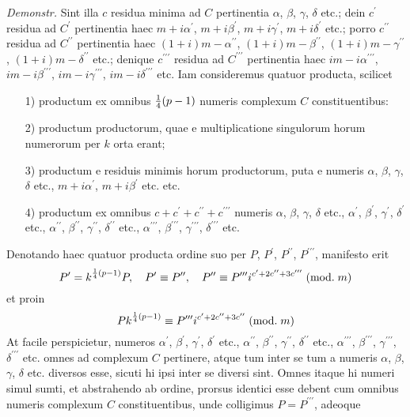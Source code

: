 \documentclass[twoside,12pt]{memoir}
\renewcommand{\pmod}[1]{\;(\textrm{mod.}\;#1)}
\let\oldfrac\frac
\def\frac#1#2{\mathchoice{\tfrac{#1}{#2}}{\oldfrac{#1}{#2}}{\genfrac{}{}{}{2}{#1}{#2\mathstrut}}{\genfrac{}{}{}{3}{#1}{#2\mathstrut}}}
\begin{document}
\textit{Demonstr.} Sint illa \(c\) residua minima ad \(C\) pertinentia \(\alpha\), \( \beta\), \( \gamma\), \( \delta\) etc.; dein \(c^{\prime}\) residua ad \(C^{\prime}\) pertinentia haec \(m+i \alpha^{\prime}\), \( m+i \beta^{\prime}\), \( m+i \gamma^{\prime}\), \( m+i \delta^{\prime}\) etc.; porro \(c^{\prime \prime}\) residua ad \(C^{\prime \prime}\) pertinentia haec \((1+i) m-\alpha^{\prime \prime}\), \((1+i) m-\beta^{\prime \prime}\), \((1+i) m-\gamma^{\prime \prime}\), \((1+i) m-\delta^{\prime \prime}\) etc.; denique \(c^{\prime \prime \prime}\) residua ad \(C^{\prime \prime \prime}\) pertinentia haec \(i m-i \alpha^{\prime \prime \prime}\), \( i m-i \beta^{\prime \prime \prime}\), \(i m-i \gamma^{\prime \prime \prime}\), \( i m-i \delta^{\prime \prime \prime}\) etc. Iam consideremus quatuor producta, scilicet
 \begin{enumerate}
\item[1)] productum ex omnibus \(\frac{1}{4}(p-1)\) numeris complexum \(C\) constituentibus:
\item[2)] productum productorum, quae e multiplicatione singulorum horum numerorum per \(k\) orta erant;
\item[3)] productum e residuis minimis horum productorum, puta e numeris \(\alpha\), \( \beta\), \(\gamma\), \( \delta\) etc., \(m+i \alpha^{\prime}\), \( m+i \beta^{\prime}\) etc. etc.
\item[4)] productum ex omnibus \(c+c^{\prime}+c^{\prime \prime}+c^{\prime \prime \prime}\) numeris \(\alpha\), \( \beta\), \( \gamma\), \( \delta\) etc., \(\alpha^{\prime}\), \( \beta^{\prime}\), \( \gamma^{\prime}\), \(\delta^{\prime}\) etc., \(\alpha^{\prime \prime}\), \( \beta^{\prime \prime}\), \( \gamma^{\prime \prime}\), \( \delta^{\prime \prime}\) etc., \(\alpha^{\prime \prime \prime}\), \( \beta^{\prime \prime \prime}\), \( \gamma^{\prime \prime \prime}\), \( \delta^{\prime \prime \prime}\) etc.
\end{enumerate}
Denotando haec quatuor producta ordine suo per \(P\), \( P^{\prime} \), \( P^{\prime \prime}\), \( P^{\prime \prime \prime}\), manifesto erit
\[P^{\prime}=k^{\frac{1}{4}(p-1)} P, \quad P^{\prime} \equiv P^{\prime \prime}, \quad P^{\prime \prime} \equiv P^{\prime \prime \prime} i^{c^{\prime}+2 c^{\prime \prime}+3 c^{\prime \prime \prime}}\pmod{m}\]
et proin
\[P k^{\frac{1}{4}(p-1)} \equiv P^{\prime \prime \prime} i^{c^{\prime}+2 c^{\prime \prime}+3 c^{\prime \prime}}\pmod{m}\]
At facile perspicietur, numeros \(\alpha^{\prime}\), \( \beta^{\prime}\), \( \gamma^{\prime}\), \( \delta^{\prime}\) etc., \(\alpha^{\prime \prime}\), \( \beta^{\prime \prime}\), \( \gamma^{\prime \prime}\), \( \delta^{\prime \prime}\) etc., \(\alpha^{\prime \prime \prime}\), \( \beta^{\prime \prime \prime}\), \( \gamma^{\prime \prime \prime}\), \( \delta^{\prime \prime \prime}\) etc. omnes ad complexum \(C\) pertinere, atque tum inter se tum a numeris \(\alpha\), \( \beta\), \( \gamma\), \( \delta\) etc. diversos esse, sicuti hi ipsi inter se diversi sint. Omnes itaque hi numeri simul sumti, et abstrahendo ab ordine, prorsus identici esse debent cum omnibus numeris complexum \(C\) constituentibus, unde colligimus \(P=P^{\prime \prime \prime}\), adeoque
\end{document}
